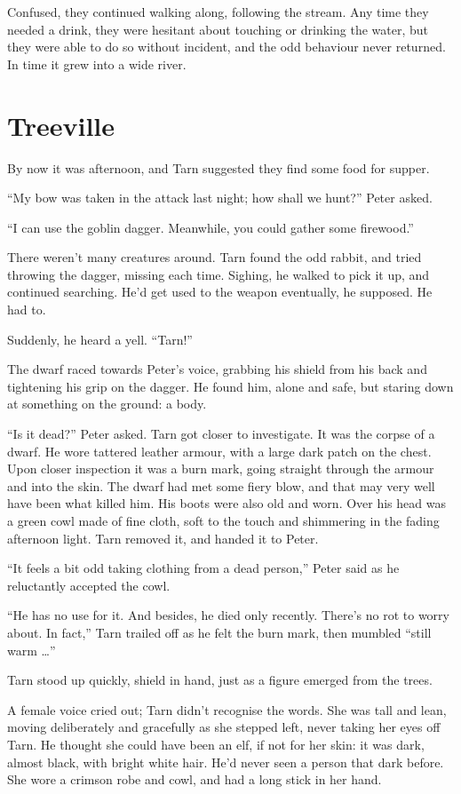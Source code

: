 Confused, they continued walking along, following the stream.  Any time they needed a drink, they were hesitant about touching or drinking the water, but they were able to do so without incident, and the odd behaviour never returned.  In time it grew into a wide river.

\chapter{Treeville}

By now it was afternoon, and Tarn suggested they find some food for supper.

``My bow was taken in the attack last night; how shall we hunt?'' Peter asked.

``I can use the goblin dagger.  Meanwhile, you could gather some firewood.''

There weren't many creatures around.  Tarn found the odd rabbit, and tried throwing the dagger, missing each time.  Sighing, he walked to pick it up, and continued searching.  He'd get used to the weapon eventually, he supposed.  He had to.

Suddenly, he heard a yell.  ``Tarn!''

The dwarf raced towards Peter's voice, grabbing his shield from his back and tightening his grip on the dagger.  He found him, alone and safe, but staring down at something on the ground: a body.

``Is it dead?'' Peter asked.  Tarn got closer to investigate. It was the corpse of a dwarf.  
He wore tattered leather armour, with a large dark patch on the chest.  Upon closer inspection it was a burn mark, going straight through the armour and into the skin.  The dwarf had met some fiery blow, and that may very well have been what killed him.  His boots were also old and worn.  Over his head was a green cowl made of fine cloth, soft to the touch and shimmering in the fading afternoon light.  Tarn removed it, and handed it to Peter.

``It feels a bit odd taking clothing from a dead person,'' Peter said as he reluctantly accepted the cowl.

``He has no use for it.  And besides, he died only recently.  There's no rot to worry about.  In fact,'' Tarn trailed off as he felt the burn mark, then mumbled ``still warm  \ldots''

Tarn stood up quickly, shield in hand, just as a figure emerged from the trees.

A female voice cried out; Tarn didn't recognise the words.  She was tall and lean, moving deliberately and gracefully as she stepped left, never taking her eyes off Tarn.  He thought she could have been an elf, if not for her skin: it was dark, almost black, with bright white hair.  He'd never seen a person that dark before.  She wore a crimson robe and cowl, and had a long stick in her hand.

